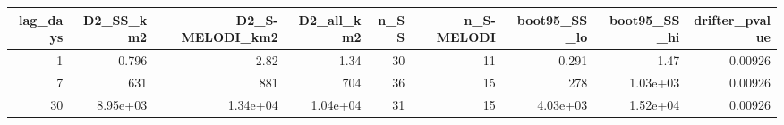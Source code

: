 \begin{tabular}{rrrrrrrrr}
\toprule
lag_days & D2_SS_km2 & D2_S-MELODI_km2 & D2_all_km2 & n_SS & n_S-MELODI & boot95_SS_lo & boot95_SS_hi & drifter_pvalue \\
\midrule
1 & 0.796 & 2.82 & 1.34 & 30 & 11 & 0.291 & 1.47 & 0.00926 \\
7 & 631 & 881 & 704 & 36 & 15 & 278 & 1.03e+03 & 0.00926 \\
30 & 8.95e+03 & 1.34e+04 & 1.04e+04 & 31 & 15 & 4.03e+03 & 1.52e+04 & 0.00926 \\
\bottomrule
\end{tabular}
